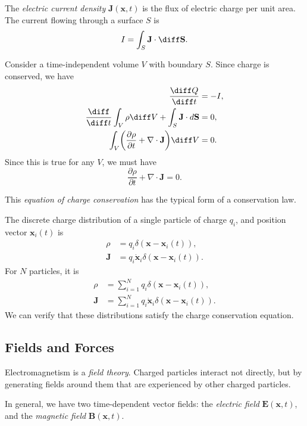 \documentclass[12pt]{article}
\begin{document}
The \emph{electric current density} $\mathbf{J}(\mathbf{x}, t)$ is the flux of electric charge per unit area. The current flowing through a surface $S$ is
\[
I = \int_{S} \mathbf{J} \cdot \diff \mathbf{S}
.\]

Consider a time-independent volume $V$ with boundary $S$. Since charge is conserved, we have
\begin{align*}
	\frac{\diff Q}{\diff t} &= -I, \\
	\frac{\diff}{\diff t} \int_{V} \rho \diff V + \int_{S} \mathbf{J} \cdot d \mathbf{S} &= 0, \\
	\int_{V} \biggl( \frac{\partial \rho}{\partial t} + \nabla \cdot \mathbf{J} \biggr) \diff V &= 0.
\end{align*}
Since this is true for any $V$, we must have
\[
\frac{\partial \rho}{\partial t} + \nabla \cdot \mathbf{J} = 0
.\]

This \emph{equation of charge conservation} has the typical form of a conservation law.

The discrete charge distribution of a single particle of charge $q_i$, and position vector $\mathbf{x}_i(t)$ is
\begin{align*}
	\rho &= q_i \delta( \mathbf{x} - \mathbf{x}_i(t)), \\
	\mathbf{J} &= q_i \mathbf{\dot x}_i \delta(\mathbf{x} - \mathbf{x}_i(t)).
\end{align*}
For $N$ particles, it is
\begin{align*}
	\rho &= \sum_{i = 1}^{N} q_i \delta(\mathbf{x} - \mathbf{x}_i(t)), \\
	\mathbf{J} &= \sum_{i = 1}^{N} q_i \mathbf{\dot x}_i \delta(\mathbf{x} - \mathbf{x}_i(t)).
\end{align*}
We can verify that these distributions satisfy the charge conservation equation.

\subsection{Fields and Forces}
\label{sub:fields_and_forces}

Electromagnetism is a \emph{field theory}. Charged particles interact not directly, but by generating fields around them that are experienced by other charged particles.

In general, we have two time-dependent vector fields: the \emph{electric field} $\mathbf{E}(\mathbf{x}, t)$, and the \emph{magnetic field} $\mathbf{B}(\mathbf{x}, t)$.
\end{document}

